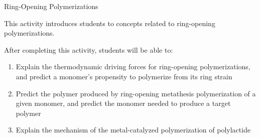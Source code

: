%
%
%
%

\renewcommand{\figpath}{content/polymchem/livingpolyms/ringopening/figs}
\renewcommand{\labelbase}{ringopening}

\begin{activity}{Ring-Opening Polymerizations}

\begin{instructornotes}
	This activity introduces students to concepts related to ring-opening polymerizations.
	
	After completing this activity, students will be able to:
	\begin{enumerate}
		\item Explain the thermodynamic driving forces for ring-opening polymerizations, and predict a monomer's propensity to polymerize from its ring strain
		\item Predict the polymer produced by ring-opening metathesis polymerization of a given monomer, and predict the monomer needed to produce a target polymer
		\item Explain the mechanism of the metal-catalyzed polymerization of polylactide
	\end{enumerate}
	

\end{instructornotes}
\end{activity}
